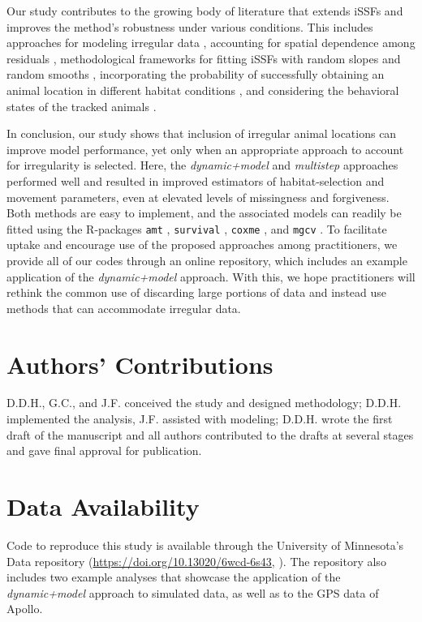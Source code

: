 \documentclass[abstract=on,10pt,a4paper,bibliography=totocnumbered]{article}
\begin{document}
Our study contributes to the growing body of literature that extends iSSFs and
improves the method's robustness under various conditions. This includes
approaches for modeling irregular data \citep{Munden.2021, Eisaguirre.2024},
accounting for spatial dependence among residuals \citep{ArceGuillen.2023},
methodological frameworks for fitting iSSFs with random slopes \citep{Muff.2020}
and random smooths \citep{Klappstein.2024}, incorporating the probability of
successfully obtaining an animal location in different habitat conditions
\citep{Vales.2022}, and considering the behavioral states of the tracked animals
\citep{Klappstein.2023, Pohle.2023}.

In conclusion, our study shows that inclusion of irregular animal locations can
improve model performance, yet only when an appropriate approach to account for
irregularity is selected. Here, the \textit{dynamic+model} and
\textit{multistep} approaches performed well and resulted in improved estimators
of habitat-selection and movement parameters, even at elevated levels of
missingness and forgiveness. Both methods are easy to implement, and the
associated models can readily be fitted using the R-packages \texttt{amt}
\citep{Signer.2019}, \texttt{survival} \citep{Therneau.2023}, \texttt{coxme}
\citep{Therneau.2022}, and \texttt{mgcv} \citep{Wood.2011, Wood.2017,
Klappstein.2024}. To facilitate uptake and encourage use of the proposed
approaches among practitioners, we provide all of our codes through an online
repository, which includes an example application of the \textit{dynamic+model}
approach. With this, we hope practitioners will rethink the common use of
discarding large portions of data and instead use methods that can accommodate
irregular data.

\section{Authors' Contributions}

D.D.H., G.C., and J.F. conceived the study and designed methodology; D.D.H.
implemented the analysis, J.F. assisted with modeling; D.D.H. wrote the first
draft of the manuscript and all authors contributed to the drafts at several
stages and gave final approval for publication.

\section{Data Availability}

Code to reproduce this study is available through the University of Minnesota's
Data repository (\url{https://doi.org/10.13020/6wcd-6s43},
\citealp{Hofmann.2023a}). The repository also includes two example analyses that
showcase the application of the \textit{dynamic+model} approach to simulated
data, as well as to the GPS data of Apollo.
\end{document}
